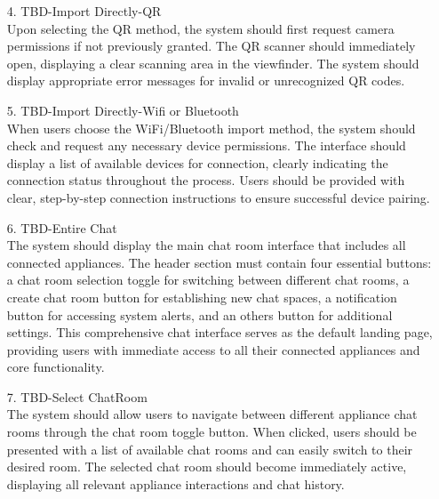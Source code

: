 \documentclass[conference]{IEEEtran}
\begin{document}
\begin{enumerate}
\begin{itemize}
\begin{itemize}
    \begin{enumerate}
        \item[4.] TBD-Import Directly-QR \\
        Upon selecting the QR method, the system should first request camera permissions if not previously granted. The QR scanner should immediately open, displaying a clear scanning area in the viewfinder. The system should display appropriate error messages for invalid or unrecognized QR codes.  \\
    \end{enumerate}
    
    \begin{enumerate}
        \item[5.] TBD-Import Directly-Wifi or Bluetooth \\
        When users choose the WiFi/Bluetooth import method, the system should check and request any necessary device permissions. The interface should display a list of available devices for connection, clearly indicating the connection status throughout the process. Users should be provided with clear, step-by-step connection instructions to ensure successful device pairing.\\
    \end{enumerate}
    
    \begin{enumerate}
        \item[6.] TBD-Entire Chat \\
        The system should display the main chat room interface that includes all connected appliances. The header section must contain four essential buttons: a chat room selection toggle for switching between different chat rooms, a create chat room button for establishing new chat spaces, a notification button for accessing system alerts, and an others button for additional settings. This comprehensive chat interface serves as the default landing page, providing users with immediate access to all their connected appliances and core functionality. \\
    \end{enumerate}
    
    \begin{enumerate}
        \item[7.] TBD-Select ChatRoom \\
        The system should allow users to navigate between different appliance chat rooms through the chat room toggle button. When clicked, users should be presented with a list of available chat rooms and can easily switch to their desired room. The selected chat room should become immediately active, displaying all relevant appliance interactions and chat history. \\
    \end{enumerate}
    

\end{itemize}
\end{itemize}
\end{enumerate}
\end{document}
